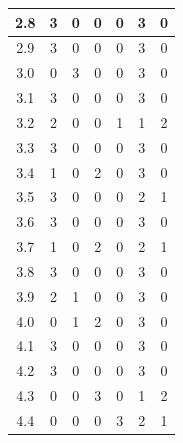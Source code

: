 \documentclass[11pt]{jreport}
\begin{document}
\begin{table}
{\begin{tabular}{c|c|c|c|c|c|c}
    \hline
    2.8 & 3 & 0 & 0 & 0 & 3 & 0 \\
    \hline
    2.9 & 3 & 0 & 0 & 0 & 3 & 0 \\
    \hline
    3.0 & 0 & 3 & 0 & 0 & 3 & 0 \\
    \hline
    3.1 & 3 & 0 & 0 & 0 & 3 & 0 \\
    \hline
    3.2& 2 & 0 & 0 & 1 & 1 & 2 \\
    \hline
    3.3 & 3 & 0 & 0 & 0 & 3 & 0 \\
    \hline
    3.4 & 1 & 0 & 2 & 0 & 3 & 0 \\
    \hline
    3.5 & 3 & 0 & 0 & 0 & 2 & 1 \\
    \hline
    3.6 & 3 & 0 & 0 & 0 & 3 & 0 \\
    \hline
    3.7 & 1 & 0 & 2 & 0 & 2 & 1 \\
    \hline
    3.8 & 3 & 0 & 0 & 0 & 3 & 0 \\
    \hline
    3.9 & 2 & 1 & 0 & 0 & 3 & 0 \\
    \hline
    4.0 & 0 & 1 & 2 & 0 & 3 & 0 \\
    \hline
    4.1 & 3 & 0 & 0 & 0 & 3 & 0 \\
    \hline
    4.2 & 3 & 0 & 0 & 0 & 3 & 0 \\
    \hline
    4.3 & 0 & 0 & 3 & 0 & 1 & 2 \\
    \hline
    4.4 & 0 & 0 & 0 & 3 & 2 & 1 \\
    \hline
    \end{tabular}
    }
\end{table}
\end{document}
